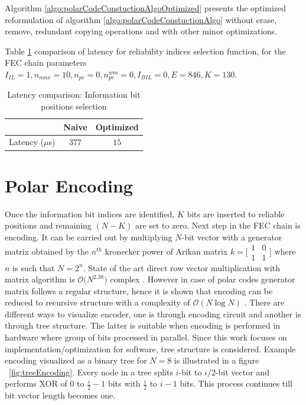 Algorithm \ref{algo:polarCodeConstuctionAlgoOptimized} presents the optimized reformulation of algorithm \ref{algo:polarCodeConstuctionAlgo} without erase, remove, redundant copying operations and with other minor optimizations.

Table \ref{tab:codeConstrLatency} comparison of latency for reliability indices selection function, for the FEC chain parameters $I_{IL} = 1, n_{max} = 10, n_{pc} = 0 ,n_{pc}^{wm} = 0, I_{BIL} = 0, E = 846, K = 130$. 
\begin{table}[!h]
	\begin{center}
		\caption{Latency comparison: Information bit positions selection}
		\label{tab:codeConstrLatency}
		\begin{tabular}{c|c|c} %
			\textbf{ } & Naive & Optimized \\
			\hline
			Latency ($\mu$s) & $377$ & $15$\\
		\end{tabular}
	\end{center}
\end{table}

\section{Polar Encoding}
Once the information bit indices are identified, $K$ bits are inserted to reliable positions and remaining  $(N-K)$ are set to zero. Next step in the FEC chain is encoding. It can be carried out by multiplying $N$-bit vector with a generator matrix obtained by the $n^{th}$ kronecker power of Arikan matrix $k = \big[\begin{smallmatrix} 1 & 0 \\ 1 & 1 \end{smallmatrix}$\big]  where $n$ is such that $N = 2^{n}$. State of the art direct row vector multiplication with matrix algorithm is $\mathcal{O}\big(N^{2.38}\big)$ complex \cite{MatrixMultComplexity}. However in case of polar codes generator matrix follows a regular structure, hence it is shown that encoding can be reduced to recursive structure with a complexity of $\mathcal{O}(N\log{}N)$ \cite{Arikan}. There are different ways to visualize encoder, one is through encoding circuit and another is through tree structure. The latter is suitable when encoding is performed in hardware where group of bits processed in parallel. Since this work focuses on implementation/optimization for software, tree structure is considered. Example encoding visualized as a binary tree for $N = 8$ is illustrated in a figure ~\ref{fig:treeEncoding}. Every node in a tree splits $i$-bit to $i/2$-bit vector and performs XOR of $0$ to $\frac{i}{2}-1$ bits with $\frac{i}{2}$ to $i-1$ bits. This process continues till bit vector length becomes one.


